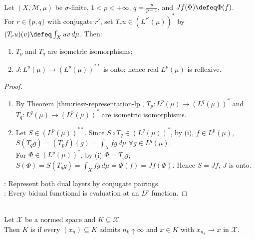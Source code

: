 \begin{theorem} \label{thm:lp-reflexive-sigma-finite} \\
Let $(X,\mathcal M,\mu)$ be $\sigma$-finite, $1<p<+\infty$, $q=\frac{p}{p-1}$, and $Jf(\Phi)\defeq\Phi(f)$.\\
For $r\in\{p,q\}$ with conjugate $r'$, set $T_ru\in(L^{r'}(\mu))^*$ by $(T_ru)(v)\defeq\int_Xuv\,d\mu$. Then:
\begin{enumerate}[label=(\roman*)]
\setlength{\itemsep}{0pt}
\item $T_p$ and $T_q$ are isometric isomorphisms;
\item $J:L^p(\mu)\to(L^p(\mu))^{**}$ is onto; hence real $L^p(\mu)$ is reflexive.
\end{enumerate}
\begin{proof}
\begin{enumerate}[label=(\roman*)]
\setlength{\itemsep}{0pt}
\item By Theorem \ref{thm:riesz-representation-lp}, $T_p:L^p(\mu)\to(L^q(\mu))^*$ and $T_q:L^q(\mu)\to(L^p(\mu))^*$ are isometric isomorphisms.
\item Let $S\in(L^p(\mu))^{**}$. Since $S\circ T_q\in(L^q(\mu))^*$, by (i), $f\in L^p(\mu)$, $S(T_qg)=(T_pf)(g)=\int_Xfg\,d\mu$ $\forall g\in L^q(\mu)$.\\
For $\Phi\in(L^p(\mu))^*$, by (i) $\Phi=T_qg$; $S(\Phi)=S(T_qg)=\int_Xfg\,d\mu=\Phi(f)=Jf(\Phi)$. Hence $S=Jf$, $J$ is onto.
\end{enumerate}
: Represent both dual layers by conjugate pairings.\\
: Every bidual functional is evaluation at an $L^p$ function.
\end{proof}
\end{theorem}

\begin{definition} \label{def:weak-sequential-compactness} \\
Let $\mathcal{X}$ be a normed space and $K\subseteq\mathcal{X}$.\\
Then $K$ is  if every $(x_n)\subseteq K$ admits $n_k\uparrow\infty$ and $x\in K$ with $x_{n_k}\rightharpoonup x$ in $\mathcal{X}$.
\end{definition}

